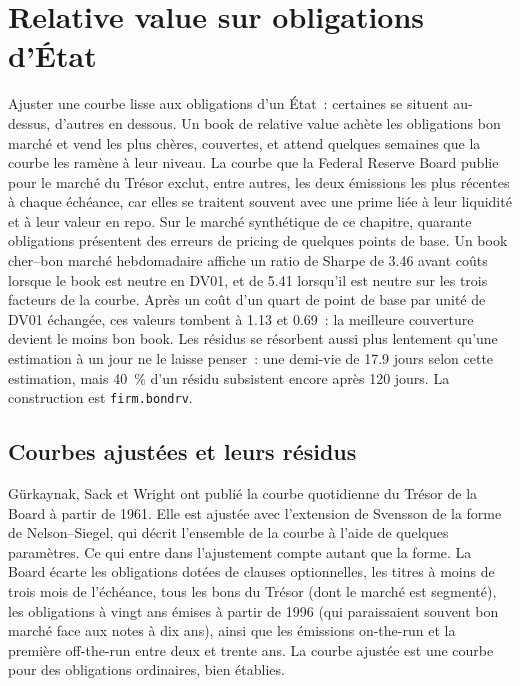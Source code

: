 \chapter{Relative value sur obligations d'État}\label{ch:s2:government-bond-relative-value}

Ajuster une courbe lisse aux obligations d'un État~: certaines se situent au-dessus, d'autres en dessous. Un book de relative value achète les obligations bon marché et vend les plus chères, couvertes,
et attend quelques semaines que la courbe les ramène à leur niveau. La courbe que la Federal Reserve Board publie pour le marché du Trésor exclut, entre autres,
les deux émissions les plus récentes à chaque échéance, car elles se traitent souvent avec une prime liée à leur liquidité et à leur valeur en repo. Sur le marché synthétique de ce chapitre,
quarante obligations présentent des erreurs de pricing de quelques points de base. Un book cher--bon marché hebdomadaire affiche un ratio de Sharpe de 3.46 avant coûts lorsque le book
est neutre en DV01, et de 5.41 lorsqu'il est neutre sur les trois facteurs de la courbe. Après un coût d'un quart de point de base par unité de DV01 échangée, ces
valeurs tombent à 1.13 et 0.69~: la meilleure couverture devient le moins bon book. Les résidus se résorbent aussi plus lentement qu'une estimation à un jour ne le laisse penser~: une demi-vie de 17.9
jours selon cette estimation, mais 40~\% d'un résidu subsistent encore après 120 jours. La construction est \texttt{firm.bondrv}.

\section{Courbes ajustées et leurs résidus}

Gürkaynak, Sack et Wright ont publié la courbe quotidienne du Trésor de la Board à partir de 1961. Elle est ajustée avec l'extension de Svensson de la forme de Nelson--Siegel,
qui décrit l'ensemble de la courbe à l'aide de quelques paramètres. Ce qui entre dans l'ajustement compte autant que la forme. La Board écarte les obligations dotées de
clauses optionnelles, les titres à moins de trois mois de l'échéance, tous les bons du Trésor (dont le marché est segmenté), les obligations à vingt ans émises à partir de 1996 (qui paraissaient souvent bon marché
face aux notes à dix ans), ainsi que les émissions on-the-run et la première off-the-run entre deux et trente ans. La courbe ajustée est une courbe pour des
obligations ordinaires, bien établies.

